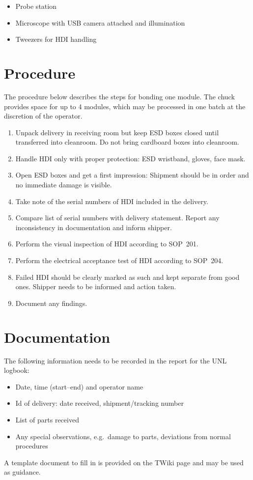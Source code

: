 \documentclass[12pt]{unlsilabsop}
\begin{document}
\begin{itemize}
    \item Probe station
    \item Microscope with USB camera attached and illumination
    \item Tweezers for HDI handling
\end{itemize}

\section{Procedure}

The procedure below describes the steps for bonding one module. The chuck provides space for up to 4 modules, which may be processed in one batch at the discretion of the operator.
\begin{enumerate}
    \item Unpack delivery in receiving room but keep ESD boxes closed until transferred into cleanroom. Do not bring cardboard boxes into cleanroom.
    \item Handle HDI only with proper protection: ESD wristband, gloves, face mask.
    \item Open ESD boxes and get a first impression: Shipment should be in order and no immediate damage is visible.
    \item Take note of the serial numbers of HDI included in the delivery.
    \item Compare list of serial numbers with delivery statement. Report any inconsistency in documentation and inform shipper.
    \item Perform the visual inspection of HDI according to SOP~201.
    \item Perform the electrical acceptance test of HDI according to SOP~204.
    \item Failed HDI should be clearly marked as such and kept separate from good ones. Shipper needs to be informed and action taken.
    \item Document any findings.
\end{enumerate}

\section{Documentation}
The following information needs to be recorded in the report for the UNL logbook:
\begin{itemize}
    \item Date, time (start--end) and operator name
    \item Id of delivery: date received, shipment/tracking number
    \item List of parts received
    \item Any special observations, e.g.~damage to parts, deviations from normal procedures
\end{itemize}
A template document to fill in is provided on the TWiki page and may be used as guidance.
\end{document}
